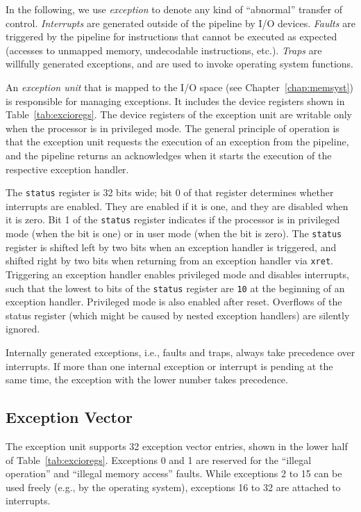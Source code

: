 \documentclass[a4paper,fontsize=10pt,twoside,DIV15,BCOR12mm,headinclude=true,footinclude=false,pagesize,bibtotoc]{scrbook}
\begin{document}
In the following, we use \emph{exception} to denote any kind of
``abnormal'' transfer of control. \emph{Interrupts} are generated
outside of the pipeline by I/O devices. \emph{Faults} are triggered by
the pipeline for instructions that cannot be executed as expected
(accesses to unmapped memory, undecodable instructions,
etc.). \emph{Traps} are willfully generated exceptions, and are used
to invoke operating system functions.

An \emph{exception unit} that is mapped to the I/O space (see
Chapter~\ref{chap:memsyst}) is responsible for managing exceptions. It
includes the device registers shown in Table~\ref{tab:excioregs}. The
device registers of the exception unit are writable only when the
processor is in privileged mode. The general principle of operation is
that the exception unit requests the execution of an exception from
the pipeline, and the pipeline returns an acknowledges when it starts
the execution of the respective exception handler.

The \texttt{status} register is 32 bits wide; bit 0 of that register
determines whether interrupts are enabled. They are enabled if it is
one, and they are disabled when it is zero. Bit 1 of the
\texttt{status} register indicates if the processor is in privileged
mode (when the bit is one) or in user mode (when the bit is zero). The
\texttt{status} register is shifted left by two bits when an exception
handler is triggered, and shifted right by two bits when returning
from an exception handler via \texttt{xret}. Triggering an exception
handler enables privileged mode and disables interrupts, such that the
lowest to bits of the \texttt{status} register are \texttt{10} at the
beginning of an exception handler. Privileged mode is also enabled
after reset. Overflows of the status register (which might be caused
by nested exception handlers) are silently ignored.

Internally generated exceptions, i.e., faults and traps, always take
precedence over interrupts. If more than one internal exception or
interrupt is pending at the same time, the exception with the lower
number takes precedence.

\subsection{Exception Vector}

The exception unit supports 32 exception vector entries, shown in the
lower half of Table~\ref{tab:excioregs}. Exceptions 0
and 1 are reserved for the ``illegal operation'' and ``illegal memory
access'' faults. While exceptions 2 to 15 can be used freely (e.g., by
the operating system), exceptions 16 to 32 are attached to interrupts.
\end{document}
